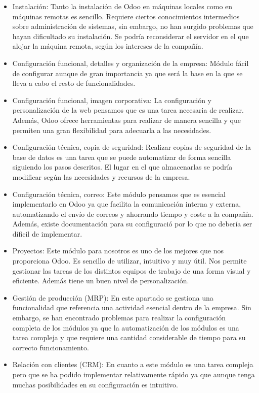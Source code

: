 \begin{itemize}
    \item Instalación: Tanto la instalación de Odoo en máquinas locales como en máquinas remotas es sencillo. Requiere ciertos conocimientos intermedios sobre administración de sistemas, sin embargo, no han surgido problemas que hayan dificultado su instalación. Se podría reconsiderar el servidor en el que alojar la máquina remota, según los intereses de la compañía.
    \item Configuración funcional, detalles y organización de la empresa: Módulo fácil de configurar aunque de gran importancia ya que será la base en la que se lleva a cabo el resto de funcionalidades.
    \item Configuración funcional, imagen corporativa: La configuración y personalización de la web pensamos que es una tarea necesaria de realizar. Además, Odoo ofrece herramientas para realizar de manera sencilla y que permiten una gran flexibilidad para adecuarla a las necesidades.
    \item Configuración técnica, copia de seguridad: Realizar copias de seguridad de la base de datos es una tarea que se puede automatizar de forma sencilla siguiendo los pasos descritos. El lugar en el que almacenarlas se podría modificar según las necesidades y recursos de la empresa.
    \item Configuración técnica, correo: Este módulo pensamos que es esencial implementarlo en Odoo ya que facilita la comunicación interna y externa, automatizando el envío de correos y ahorrando tiempo y coste a la compañía. Además, existe documentación para su configuració por lo que no debería ser díficil de implementar.
    \item Proyectos: Este módulo para nosotros es uno de los mejores que nos proporciona Odoo. Es sencillo de utilizar, intuitivo y muy útil. Nos permite gestionar las tareas de los distintos equipos de trabajo de una forma visual y eficiente. Además tiene un buen nivel de personalización. 
    \item Gestión de producción (MRP): En este apartado se gestiona una funcionalidad que referencia una actividad esencial dentro de la empresa. Sin embargo, se han encontrado problemas para realizar la configuración completa de los módulos ya que la automatización de los módulos es una tarea compleja y que requiere una cantidad considerable de tiempo para su correcto funcionamiento.  
    \item Relación con clientes (CRM): En cuanto a este módulo es una tarea compleja pero que se ha podido implementar relativamente rápido ya que aunque tenga muchas posibilidades en su configuración es intuitivo.

\end{itemize}
